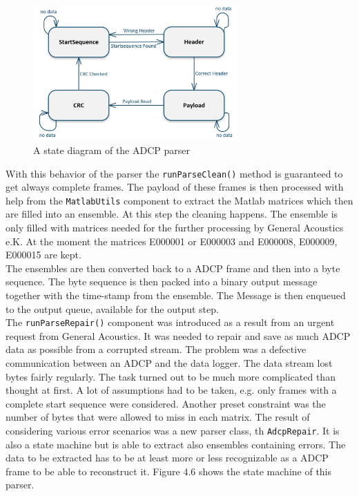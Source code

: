 \begin{figure}[h]
\centering
      \includegraphics[width=0.7\textwidth]{parser}
        \caption{A state diagram of the ADCP parser}
\end{figure}

With this behavior of the parser the \texttt{runParseClean()} method is  guaranteed to get always complete frames. The payload of these frames is then processed with help from the \texttt{MatlabUtils} component to extract the Matlab matrices which then are filled into an ensemble. At this step the cleaning happens. The ensemble is only filled with matrices needed for the further processing by General Acoustics e.K. At the moment the matrices E000001 or E000003 and E000008, E000009, E000015 are kept.\\
The ensembles are then converted back to a ADCP frame and then into a byte sequence. The byte sequence is then packed into a binary output message together with the time-stamp from the ensemble. The Message is then enqueued to the output queue, available for the output step.\\

The \texttt{runParseRepair()} component was introduced as a result from an urgent request from General Acoustics. It was needed to repair and save as much ADCP data as possible from a corrupted stream. The problem was a defective communication between an ADCP and the data logger. The data stream lost bytes fairly regularly.
The task turned out to be much more complicated than thought at first. A lot of assumptions had to be taken, e.g. only frames with a complete start sequence were considered. Another preset constraint was the number of bytes that were allowed to miss in each matrix. The result of considering various error scenarios was a new parser class, th \texttt{AdcpRepair}. It is also a state machine but is able to extract also ensembles containing errors. The data to be extracted has to be at least more or less recognizable as a ADCP frame to be able to reconstruct it. Figure 4.6 shows the state machine of this parser.\\

